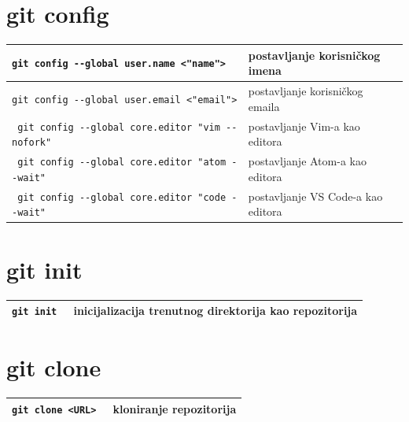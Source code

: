 \documentclass[10pt]{article}
\begin{document}
\renewcommand{\arraystretch}{1.50}

    \section*{\color{BrickRed} git config}
    \begin{tabular}{|>{\tt}p{9.00cm}|>{}p{15.50cm}|}
        \hline
        git config -{}-global user.name <"name">                & postavljanje korisničkog imena \\ \hline
        git config -{}-global user.email <"email">              & postavljanje korisničkog emaila \\ \hline
        git config -{}-global core.editor "vim -{}-nofork"      & postavljanje Vim-a kao editora \\ \hline 
        git config -{}-global core.editor "atom -{}-wait"       & postavljanje Atom-a kao editora \\ \hline
        git config -{}-global core.editor "code -{}-wait"       & postavljanje VS Code-a kao editora \\ \hline
    \end{tabular}

    \section*{\color{BrickRed} git init}
    \begin{tabular}{|>{\tt}p{9.00cm}|>{}p{15.50cm}|}
        \hline
        git init                                                & inicijalizacija trenutnog direktorija kao repozitorija \\ \hline
    \end{tabular}

    \section*{\color{BrickRed} git clone}
    \begin{tabular}{|>{\tt}p{9.00cm}|>{}p{15.50cm}|}
        \hline
        git clone <URL>                                         & kloniranje repozitorija \\ \hline
    \end{tabular}
\end{document}
